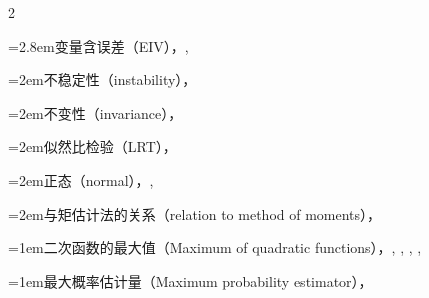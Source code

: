 \begin{multicols}{2}
\par\noindent\hangindent=2.8em\hspace*{1.8em}\label{idx:675}变量含误差（EIV），\hyperref[idxocc:675:505]{\pageref*{idxocc:675:505}}, \hyperref[idxocc:675:507]{\pageref*{idxocc:675:507}}\par
\par\noindent\hangindent=2em\hspace*{1em}\label{idx:676}不稳定性（instability），\hyperref[ex:7.2.13]{\pageref*{ex:7.2.13}}\par
\par\noindent\hangindent=2em\hspace*{1em}\label{idx:677}不变性（invariance），\hyperref[thm:7.2.10]{\pageref*{thm:7.2.10}}\par
\par\noindent\hangindent=2em\hspace*{1em}\label{idx:678}似然比检验（LRT），\hyperref[idxocc:678:335]{\pageref*{idxocc:678:335}}\par
\par\noindent\hangindent=2em\hspace*{1em}\label{idx:679}正态（normal），\hyperref[ex:7.2.5]{\pageref*{ex:7.2.5}}, \hyperref[ex:7.2.11]{\pageref*{ex:7.2.11}}\par
\par\noindent\hangindent=2em\hspace*{1em}\label{idx:680}与矩估计法的关系（relation to method of moments），\hyperref[sec:7.5.1]{\pageref*{sec:7.5.1}}\par
\par\addvspace{2pt}
\par\noindent\hangindent=1em\hspace*{0em}\label{idx:681}二次函数的最大值（Maximum of quadratic functions），\hyperref[lem:11.2.7]{\pageref*{lem:11.2.7}}, \hyperref[eq:11.3.18]{\pageref*{eq:11.3.18}}, \hyperref[thm:11.3.6]{\pageref*{thm:11.3.6}}, \hyperref[exercise:11.14]{\pageref*{exercise:11.14}}, \hyperref[item:11.40.a]{\pageref*{item:11.40.a}}\par
\par\addvspace{2pt}
\par\noindent\hangindent=1em\hspace*{0em}\label{idx:682}最大概率估计量（Maximum probability estimator），\hyperref[item:11.37.e]{\pageref*{item:11.37.e}}\par

\end{multicols}
